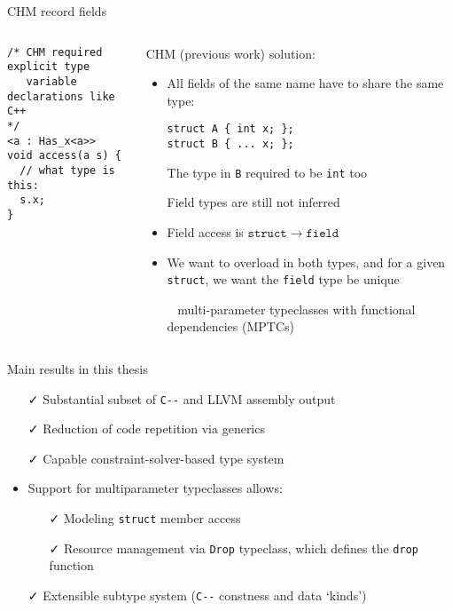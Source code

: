 \documentclass[aspectratio=169]{beamer}
\newcommand{\li}[1]{\lstinline{#1}}
\def\cmm{\texttt{C-\relax-}}
\begin{document}
\begin{frame}[fragile]{CHM record fields}
\begin{columns}
  \begin{column}{.5\linewidth}
    \begin{lstlisting}[basicstyle=\scriptsize\ttfamily]
/* CHM required explicit type
   variable declarations like C++
*/
<a : Has_x<a>>
void access(a s) {
  // what type is this:
  s.x;
}
    \end{lstlisting}
  \end{column}%
  \begin{column}{.5\linewidth}
    CHM (previous work) solution:
    \begin{itemize}\small
      \item All fields of the same name have to share the same type:

      
      \lstinline|struct A { int x; };|\\
      \lstinline|struct B { ... x; };|

      The type in \li{B} required to be \li{int} too

      \item[\color{red}\faTimes] Field types are still not inferred
      \item Field access is $\mathtt{struct} \to \mathtt{field}$
      \item We want to overload in both types, and for a given \li{struct}, we want the \li{field} type be unique
      
      \faArrowRight~ multi-parameter typeclasses with functional dependencies (MPTCs)
    \end{itemize}
  \end{column}
\end{columns}
\end{frame}

\begin{frame}{Main results in this thesis}
  \begin{itemize}
  \item[\color{green!80!black}\faCheck] Substantial subset of \cmm{} and LLVM assembly output
  \item[\color{green!80!black}\faCheck] Reduction of code repetition via generics
  \item[\color{green!80!black}\faCheck] Capable constraint-solver-based type system
  \item Support for multiparameter typeclasses allows:
    \begin{itemize}
      \item[\color{green!80!black}\faCheck] Modeling \li{struct} member access
      \item[\color{green!80!black}\faCheck] Resource management via \li{Drop} typeclass, which defines the \li{drop} function
    \end{itemize}
  \item[\color{green!80!black}\faCheck] Extensible subtype system (\cmm{} constness and data `kinds')
  \end{itemize}
\end{frame}
\end{document}
